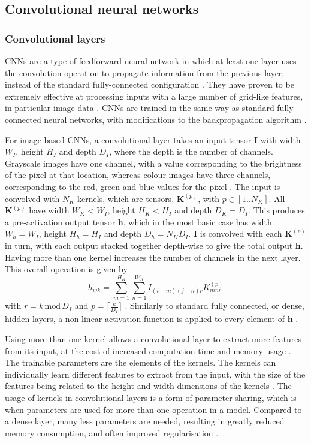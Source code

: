 \documentclass[12pt]{article}
\begin{document}
\subsection{Convolutional neural networks}
\subsubsection{Convolutional layers}
CNNs are a type of feedforward neural network in which at least one layer uses the convolution operation to propagate information from the previous layer, instead of the standard fully-connected configuration \cite{Goodfellow16}. They have proven to be extremely effective at processing inputs with a large number of grid-like features, in particular image data \cite{Shrestha19}. CNNs are trained in the same way as standard fully connected neural networks, with modifications to the backpropagation algorithm \cite{Bengio93}.

For image-based CNNs, a convolutional layer takes an input tensor $\bm{I}$ with width $W_I$, height $H_I$ and depth $D_I$, where the depth is the number of channels. Grayscale images have one channel, with a value corresponding to the brightness of the pixel at that location, whereas colour images have three channels, corresponding to the red, green and blue values for the pixel \cite{Aghdam17, Goodfellow16}. The input is convolved with $N_K$ kernels, which are tensors, $\bm{K}^{(p)}$, with $p\in[1..N_K]$. All $\bm{K}^{(p)}$ have width $W_K<W_I$, height $H_K<H_I$ and depth $D_K=D_I$. This produces a pre-activation output tensor $\bm{\bm{h}}$, which in the most basic case has width $W_h=W_I$, height $H_h=H_I$ and depth $D_h=N_KD_I$. $\bm{I}$ is convolved with each $\bm{K}^{(p)}$ in turn, with each output stacked together depth-wise to give the total output $\bm{h}$. Having more than one kernel increases the number of channels in the next layer. This overall operation is given by
\begin{equation}
h_{ijk}=\sum_{m=1}^{H_K}\sum_{n=1}^{W_K}I_{(i-m)(j-n)r}K_{mnr}^{(p)}
\end{equation}
with $r=k\,\mathrm{mod}\,D_I$ and $p=\lceil\frac{k}{D_I}\rceil$ \cite{Aghdam17, Goodfellow16}. Similarly to standard fully connected, or dense, hidden layers, a non-linear activation function is applied to every element of $\bm{h}$ \cite{Aghdam17, Goodfellow16}. 

Using more than one kernel allows a convolutional layer to extract more features from its input, at the cost of increased computation time and memory usage \cite{Goodfellow16}. The trainable parameters are the elements of the kernels. The kernels can individually learn different features to extract from the input, with the size of the features being related to the height and width dimensions of the kernels \cite{Aghdam17, Goodfellow16}. The usage of kernels in convolutional layers is a form of parameter sharing, which is when parameters are used for more than one operation in a model. Compared to a dense layer, many less parameters are needed, resulting in greatly reduced memory consumption, and often improved regularisation \cite{Aghdam17, Goodfellow16}. 
\end{document}
